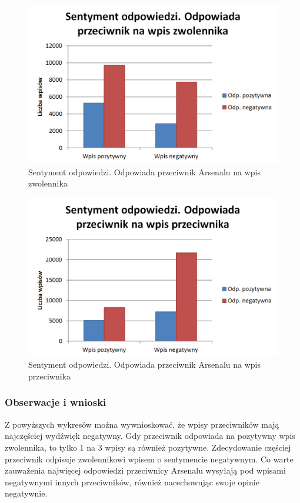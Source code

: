 \begin{figure}[ht!] \centering
\includegraphics[width=120mm]{img/reply-sentiment-przeciwnik-zwolennik.png}
\caption{Sentyment odpowiedzi. Odpowiada przeciwnik Arsenalu na wpis zwolennika}
\label{image:reply-sentiment-przeciwnik-zwolennik}
\end{figure}

\clearpage
\begin{figure}[ht!] \centering
\includegraphics[width=120mm]{img/reply-sentiment-przeciwnik-przeciwnik.png}
\caption{Sentyment odpowiedzi. Odpowiada przeciwnik Arsenalu na wpis przeciwnika}
\label{image:reply-sentiment-przeciwnik-przeciwnik}
\end{figure}

\subsubsection{Obserwacje i wnioski}
Z powyższych wykresów można wywnioskować, że wpisy przeciwników mają najczęściej
wydźwięk negatywny. Gdy przeciwnik odpowiada na pozytywny wpis zwolennika, to tylko
1 na 3 wpisy są również pozytywne. Zdecydowanie częściej przeciwnik odpisuje
zwolennikowi wpisem o sentymencie negatywnym. 
Co warte zauważenia najwięcej odpowiedzi przeciwnicy Arsenalu wysyłają
pod wpisami negatywnymi innych przeciwników, również nacechowując swoje opinie
negatywnie.

